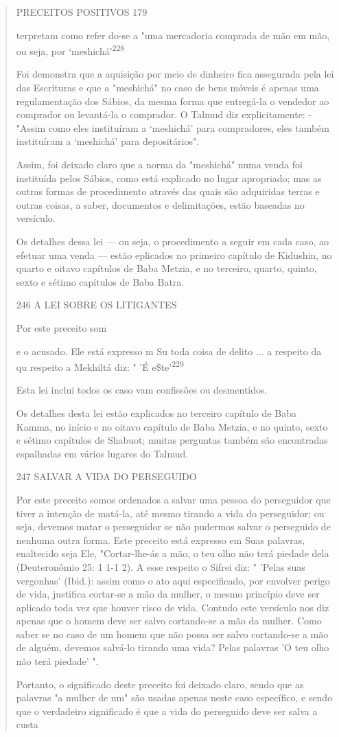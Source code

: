 \begin{quote}
PRECEITOS POSITIVOS 179

terpretam como refer do-se a "uma mercadoria comprada de mão em mão, ou
seja, por `meshichá'\textsuperscript{228}

Foi demonstra que a aquisição por meio de dinheiro fica assegu­rada pela
lei das Escrituras e que a "meshichá" no caso de bens móveis é ape­nas
uma regulamentação dos Sábios, da mesma forma que entregá-la o vende­dor
ao comprador ou levantá-la o comprador. O Talmud diz explicitamente:
-"Assim como eles instituíram a `meshichá' para compradores, eles também
ins­tituíram a `meshichá' para depositários".

Assim, foi deixado claro que a norma da "meshichá" numa venda foi
instituída pelos Sábios, como está explicado no lugar apropriado; mas as
outras formas de procedimento através das quais são adquiridas terras e
outras coisas, a saber, documentos e delimitações, estão baseadas no
versículo.

Os detalhes dessa lei --- ou seja, o procedimento a seguir em cada caso,
ao efetuar uma venda --- estão eplicados no primeiro capítulo de
Kidus­hin, no quarto e oitavo capítulos de Baba Metzia, e no terceiro,
quarto, quinto, sexto e sétimo capítulos de Baba Batra.

246 A LEI SOBRE OS LITIGANTES

Por este preceito som

e o acusado. Ele está expresso m Su toda coisa de delito ... a respeito
da qu respeito a Mekhiltá diz: " 'É e\$te'\textsuperscript{229}

Esta lei inclui todos os caso vam confissões ou desmentidos.

Os detalhes desta lei estão explicados no terceiro capítulo de Baba
Kamma, no início e no oitavo capítulo de Baba Metzia, e no quinto, sexto
e sétimo capítulos de Shabuot; muitas perguntas também são encontradas
espa­lhadas em vários lugares do Talmud.

247 SALVAR A VIDA DO PERSEGUIDO

Por este preceito somos ordenados a salvar uma pessoa do persegui­dor
que tiver a intenção de matá-la, até mesmo tirando a vida do
perseguidor; ou seja, devemos matar o perseguidor se não pudermos salvar
o perseguido de nenhuma outra forma. Este preceito está expresso em Suas
palavras, enalte­cido seja Ele, "Cortar-lhe-ás a mão, o teu olho não
terá piedade dela (Deutero­nômio 25: 1 1-1 2). A esse respeito o Sifrei
diz: " 'Pelas suas vergonhas' (Ibid.): assim como o ato aqui
especificado, por envolver perigo de vida, justifica cortar-se a mão da
mulher, o mesmo princípio deve ser aplicado toda vez que houver risco de
vida. Contudo este versículo nos diz apenas que o homem deve ser salvo
cortando-se a mão da mulher. Como saber se no caso de um homem que não
possa ser salvo cortando-se a mão de alguém, devemos salvá-lo tirando
uma vida? Pelas palavras 'O teu olho não terá piedade' ".

Portanto, o significado deste preceito foi deixado claro, sendo que as
palavras "a mulher de um" são usadas apenas neste caso específico, e
sendo que o verdadeiro significado é que a vida do perseguido deve ser
salva a custa
\end{quote}

